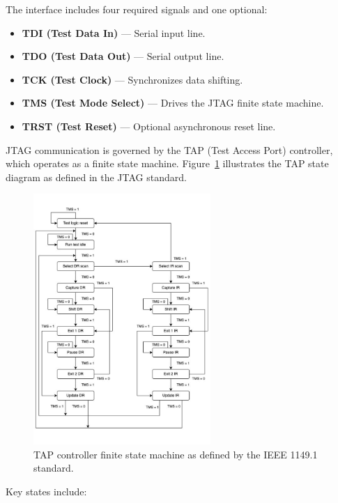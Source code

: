 \documentclass[a4paper,11pt,oneside]{report}
\begin{document}
The interface includes four required signals and one optional:  

\begin{itemize}
    \item \textbf{TDI (Test Data In)} — Serial input line.  
    \item \textbf{TDO (Test Data Out)} — Serial output line.  
    \item \textbf{TCK (Test Clock)} — Synchronizes data shifting.  
    \item \textbf{TMS (Test Mode Select)} — Drives the JTAG finite state machine.  
    \item \textbf{TRST (Test Reset)} — Optional asynchronous reset line.  
\end{itemize}

JTAG communication is governed by the TAP (Test Access Port) controller,  
which operates as a finite state machine.  
Figure~\ref{fig:tap-fsm} illustrates the TAP state diagram as defined in the JTAG standard.

\begin{figure}
    \centering
    \includegraphics[width=0.6\textwidth]{figures/TAP_FSM.pdf} %
    \caption{TAP controller finite state machine as defined by the IEEE 1149.1 standard.}
    \label{fig:tap-fsm}
\end{figure}

Key states include:  
\end{document}
